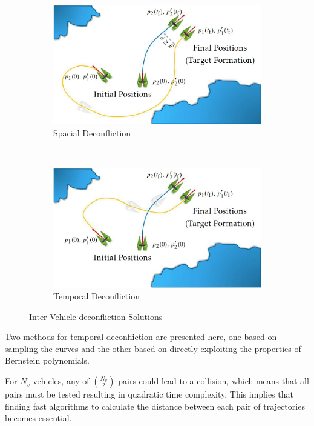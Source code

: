 \begin{figure}
    \centering
    \begin{subfigure}[b]{0.45\textwidth}
        \includegraphics[width=\textwidth]{Images/spacial_deconf.jpg}
        \caption{Spacial Deconfliction}
    \end{subfigure}
    ~
    \begin{subfigure}[b]{0.45\textwidth}
        \includegraphics[width=\textwidth]{Images/temporal_deconf.jpg}
        \caption{Temporal Deconfliction}
    \end{subfigure}
    \caption{Inter Vehicle deconfliction Solutions}
    \label{fig:deconfliction}
\end{figure}

\par Two methods for temporal deconfliction are presented here, one based on sampling the curves and the other based on directly exploiting the properties of Bernstein polynomials.

\par For $N_v$ vehicles, any of ${N_v \choose 2}$ pairs could lead to a collision, which means that all pairs must be tested resulting in quadratic time complexity. This implies that finding fast algorithms to calculate the distance between each pair of trajectories becomes essential.

